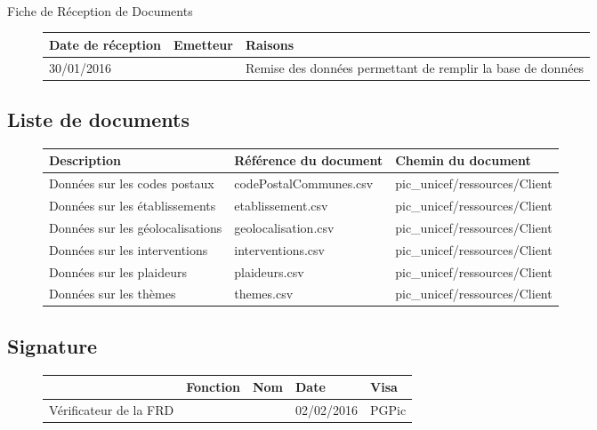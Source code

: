 \documentclass[asi, sansVersion]{picInsa}
\begin{document}
\begin{center}
\huge
\nomEquipe{}\\
Fiche de Réception de Documents\\
\end{center}
\vspace{0.5cm}


\begin{figure}[H]
		\centering
		\begin{tabularx}{17cm}{|X|X|X|}
		\hline
		\rowcolor[gray]{0.85}Date de réception & Emetteur & Raisons \\
		\hline
		30/01/2016 & \nomClient{} & Remise des données permettant de remplir la base de données\\
		\hline
		\end{tabularx}
\end{figure}

\subsection*{Liste de documents}

\begin{figure}[H]
		\centering
		\begin{tabularx}{17cm}{|X|X|X|}
		\hline
		\rowcolor[gray]{0.85} Description & Référence du document & Chemin du document \\
		\hline		
		Données sur les codes postaux & codePostalCommunes.csv & pic\_unicef/ressources/Client \\
		\hline
		Données sur les établissements & etablissement.csv & pic\_unicef/ressources/Client\\
		\hline
		Données sur les géolocalisations & geolocalisation.csv & pic\_unicef/ressources/Client\\
		\hline
		Données sur les interventions & interventions.csv & pic\_unicef/ressources/Client\\
		\hline
		Données sur les plaideurs & plaideurs.csv & pic\_unicef/ressources/Client\\
		\hline
		Données sur les thèmes & themes.csv & pic\_unicef/ressources/Client\\
		\hline
		\end{tabularx}
\end{figure}

\subsection*{Signature}

\begin{figure}[H]
		\centering
		\begin{tabularx}{17cm}{|p{4cm}|X|X|X|X|}
		\hline
		\rowcolor[gray]{0.85}& Fonction & Nom & Date & Visa \\
		\hline
		 Vérificateur de la FRD & \RGC & \Mathieu & 02/02/2016 & PGPic \\
		\hline
		\end{tabularx}
\end{figure}
\end{document}

